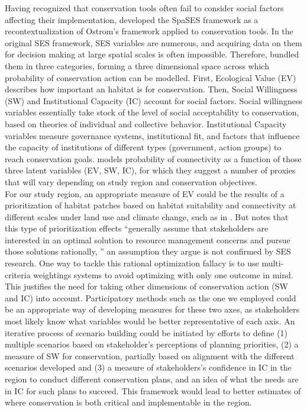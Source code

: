\documentclass[12pt,Bold,TexShade]{thesis/mcgilletdclass}
\begin{document}
{Having recognized that conservation tools often fail to consider social factors affecting their implementation, \cite{williamson_spatially_2018} developed the SpaSES framework as a recontextualization of Ostrom’s framework applied to conservation tools. In the original SES framework, SES variables are numerous, and acquiring data on them for decision making at large spatial scales is often impossible. Therefore, \citeauthor{williamson_spatially_2018} bundled them in three categories, forming a three dimensional space across which probability of conservation action can be modelled. First, Ecological Value (EV) describes how important an habitat is for conservation. Then, Social Willingness (SW) and Institutional Capacity (IC) account for social factors. Social willingness variables essentially take stock of the level of social acceptability to conservation, based on theories of individual and collective behavior. Institutional Capacity variables measure governance systems, institutional fit, and factors that influence the capacity of institutions of different types (government, action groups) to reach conservation goals. \citeauthor{williamson_spatially_2018} models probability of connectivity as a function of those three latent variables (EV, SW, IC), for which they suggest a number of proxies that will vary depending on study region and conservation objectives. \\

For our study region, an appropriate measure of EV could be the results of a prioritization of habitat patches based on habitat suitability and connectivity at different scales under land use and climate change, such as in \cite{albert_applying_2017}. But \citeauthor{williamson_spatially_2018} notes that this type of prioritization effects “generally assume that stakeholders are interested in an optimal solution to resource management concerns and pursue those solutions rationally, ” an assumption they argue is not confirmed by SES research. One way to tackle this rational optimization fallacy is to use multi-criteria weightings systems to avoid optimizing with only one outcome in mind. This justifies the need for taking other dimensions of conservation action (SW and IC) into account. Participatory methods such as the one we employed could be an appropriate way of developing measures for these two axes, as stakeholders most likely know what variables would be better representative of each axis. An iterative process of scenario building could be initiated by efforts to define (1) multiple scenarios based on stakeholder’s perceptions of planning priorities, (2) a measure of SW for conservation, partially based on alignment with the different scenarios developed and (3) a measure of stakeholders’s confidence in IC in the region to conduct different conservation plans, and an idea of what the needs are in IC for such plans to succeed. This framework would lead to better estimates of where conservation is both critical and implementable in the region. \\

}
\end{document}
